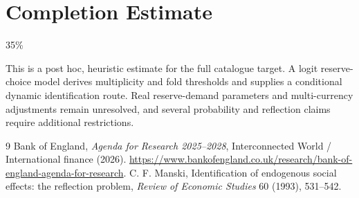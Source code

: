 \documentclass[11pt]{article}
\theoremstyle{definition}
\begin{document}
\section{Completion Estimate}
35\%

This is a post hoc, heuristic estimate for the full catalogue target.
A logit reserve-choice model derives multiplicity and fold thresholds and supplies a conditional dynamic identification route. Real reserve-demand parameters and multi-currency adjustments remain unresolved, and several probability and reflection claims require additional restrictions.

\begin{thebibliography}{9}
 Bank of England, \emph{Agenda for Research 2025--2028}, Interconnected World / International finance (2026). \url{https://www.bankofengland.co.uk/research/bank-of-england-agenda-for-research}.
 C. F. Manski, Identification of endogenous social effects: the reflection problem, \emph{Review of Economic Studies} 60 (1993), 531--542.
\end{thebibliography}
\end{document}
